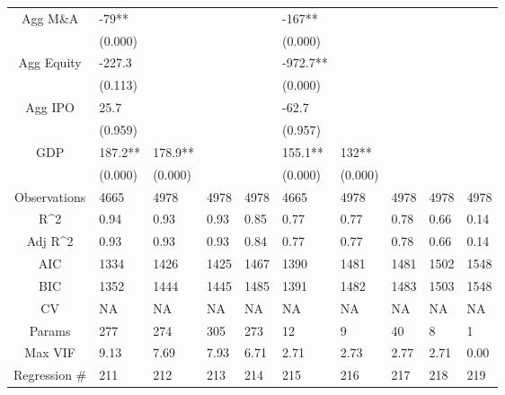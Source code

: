 \documentclass{article}
\begin{document}
\begin{table}[H]
\begin{tabular}{|clllllllll|}
  Agg M\&A & -79** &  &  &  & -167** &  &  &  &  \\
   & (0.000) &  &  &  & (0.000) &  &  &  &  \\
  Agg Equity & -227.3 &  &  &  & -972.7** &  &  &  &  \\
   & (0.113) &  &  &  & (0.000) &  &  &  &  \\
  Agg IPO & 25.7 &  &  &  & -62.7 &  &  &  &  \\
   & (0.959) &  &  &  & (0.957) &  &  &  &  \\
  GDP & 187.2** & 178.9** &  &  & 155.1** & 132** &  &  &  \\
   & (0.000) & (0.000) &  &  & (0.000) & (0.000) &  &  &  \\
  \hline
 Observations & 4665 & 4978 & 4978 & 4978 & 4665 & 4978 & 4978 & 4978 & 4978 \\
  R^2 & 0.94 & 0.93 & 0.93 & 0.85 & 0.77 & 0.77 & 0.78 & 0.66 & 0.14 \\
  Adj R^2 & 0.93 & 0.93 & 0.93 & 0.84 & 0.77 & 0.77 & 0.78 & 0.66 & 0.14 \\
  AIC & 1334 & 1426 & 1425 & 1467 & 1390 & 1481 & 1481 & 1502 & 1548 \\
  BIC & 1352 & 1444 & 1445 & 1485 & 1391 & 1482 & 1483 & 1503 & 1548 \\
  CV & NA & NA & NA & NA & NA & NA & NA & NA & NA \\
  Params & 277 & 274 & 305 & 273 & 12 & 9 & 40 & 8 & 1 \\
  Max VIF & 9.13 & 7.69 & 7.93 & 6.71 & 2.71 & 2.73 & 2.77 & 2.71 & 0.00 \\
  Regression \# & 211 & 212 & 213 & 214 & 215 & 216 & 217 & 218 & 219 \\
   \hline
\end{tabular}

\end{table}
\end{document}
